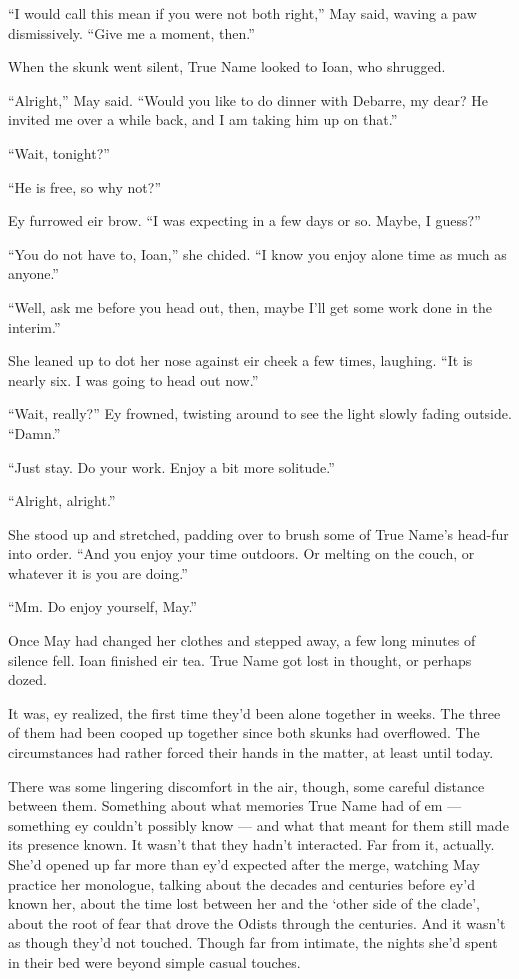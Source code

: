 ``I would call this mean if you were not both right,'' May said, waving a paw dismissively. ``Give me a moment, then.''

When the skunk went silent, True Name looked to Ioan, who shrugged.

``Alright,'' May said. ``Would you like to do dinner with Debarre, my dear? He invited me over a while back, and I am taking him up on that.''

``Wait, tonight?''

``He is free, so why not?''

Ey furrowed eir brow. ``I was expecting in a few days or so. Maybe, I guess?''

``You do not have to, Ioan,'' she chided. ``I know you enjoy alone time as much as anyone.''

``Well, ask me before you head out, then, maybe I'll get some work done in the interim.''

She leaned up to dot her nose against eir cheek a few times, laughing. ``It is nearly six. I was going to head out now.''

``Wait, really?'' Ey frowned, twisting around to see the light slowly fading outside. ``Damn.''

``Just stay. Do your work. Enjoy a bit more solitude.''

``Alright, alright.''

She stood up and stretched, padding over to brush some of True Name's head-fur into order. ``And you enjoy your time outdoors. Or melting on the couch, or whatever it is you are doing.''

``Mm. Do enjoy yourself, May.''

Once May had changed her clothes and stepped away, a few long minutes of silence fell. Ioan finished eir tea. True Name got lost in thought, or perhaps dozed.

It was, ey realized, the first time they'd been alone together in weeks. The three of them had been cooped up together since both skunks had overflowed. The circumstances had rather forced their hands in the matter, at least until today.

There was some lingering discomfort in the air, though, some careful distance between them. Something about what memories True Name had of em — something ey couldn't possibly know — and what that meant for them still made its presence known. It wasn't that they hadn't interacted. Far from it, actually. She'd opened up far more than ey'd expected after the merge, watching May practice her monologue, talking about the decades and centuries before ey'd known her, about the time lost between her and the `other side of the clade', about the root of fear that drove the Odists through the centuries. And it wasn't as though they'd not touched. Though far from intimate, the nights she'd spent in their bed were beyond simple casual touches.

